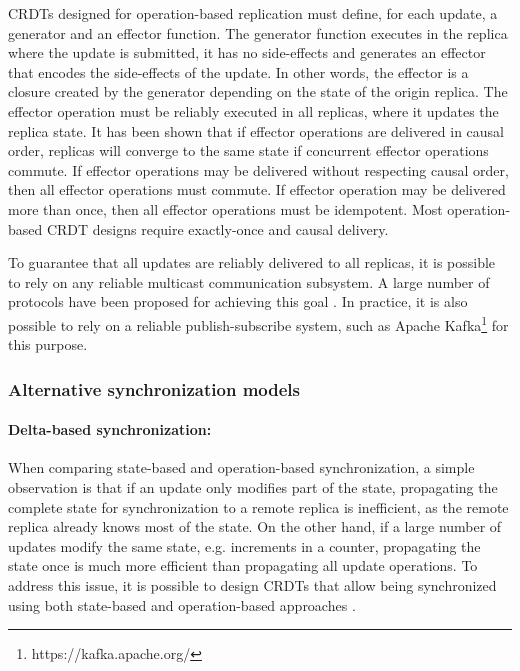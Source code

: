 \documentclass[11pt,a4paper]{article}
\begin{document}
CRDTs designed for operation-based replication must define, for each update, 
a generator and an effector function. 
The generator function executes in the replica 
where the update is submitted, it has no side-effects and generates an effector 
that encodes the side-effects of the update. In other words, the effector is a 
closure created by the generator depending on the state of the origin replica.
The effector operation must be reliably executed in all replicas, where it
updates the replica state. 
It has been shown \cite{Shapiro11Conflict} that if effector operations are delivered
in causal order, replicas will converge to the same state if concurrent effector operations
commute.
If effector operations may be delivered without respecting causal order, then all 
effector operations must commute.
If effector operation may be delivered more than once, then all effector operations
must be idempotent.
Most operation-based CRDT designs require exactly-once and causal delivery. 

To guarantee that all updates are reliably delivered to 
all replicas, it is possible to rely on any reliable multicast communication 
subsystem.
A large number of protocols have been proposed for achieving this 
goal \cite{Chang84Reliable,Birman87Reliable,Demers87Epidemic}. 
In practice, it is also possible to rely on a reliable publish-subscribe 
system, such as Apache Kafka\footnote{https://kafka.apache.org/} for this purpose.

\subsubsection{Alternative synchronization models}

\paragraph{Delta-based synchronization:}
When comparing state-based and opera\-tion-based synchronization, a simple
observation is that if an update only modifies part of the state, 
propagating the complete state for synchronization to a remote replica is 
inefficient, as the remote replica already knows most of the state. 
On the other hand, if a large number of updates modify the same 
state, e.g. increments in a counter, propagating the state once is much more
efficient than propagating all update operations.
To address this issue, it is possible to design CRDTs that allow being 
synchronized using both state-based and operation-based approaches \cite{Bieniusa12Optimized}. 
\end{document}
